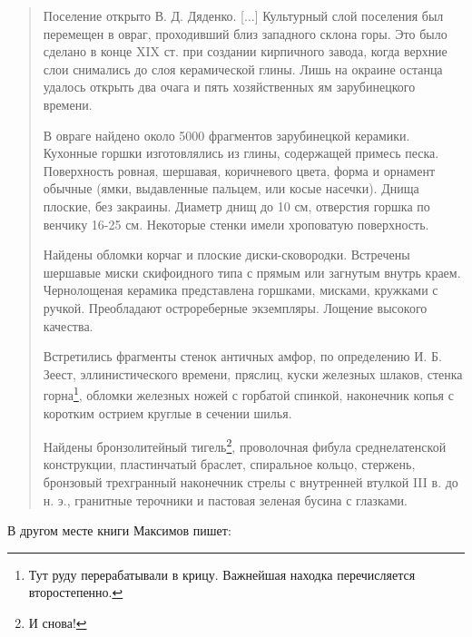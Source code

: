\begin{quotation}
Поселение открыто В. Д. Дяденко. [...] Культурный слой поселения был перемещен в овраг, проходивший близ западного склона горы. Это было сделано в конце XIX ст. при создании кирпичного завода, когда верхние слои снимались до слоя керамической глины. Лишь на окраине останца удалось открыть два очага и пять хозяйственных ям зарубинецкого времени. 

В овраге найдено около 5000 фрагментов зарубинецкой керамики. Кухонные горшки изготовлялись из глины, содержащей примесь песка. Поверхность ровная, шершавая, коричневого цвета, форма и орнамент обычные (ямки, выдавленные пальцем, или косые насечки). Днища плоские, без закраины. Диаметр днищ до 10 см, отверстия горшка по венчику 16-25 см. Некоторые стенки имели хроповатую поверхность. 

Найдены обломки корчаг и плоские диски-сковородки. Встречены шершавые миски скифоидного типа с прямым или загнутым внутрь краем. Чернолощеная керамика представлена горшками, мисками, кружками с ручкой. Преобладают острореберные экземпляры. Лощение высокого качества. 

Встретились фрагменты стенок античных амфор, по определению И. Б. Зеест, эллинистического времени, пряслиц, куски железных шлаков, стенка горна\footnote{Тут руду перерабатывали в крицу. Важнейшая находка перечисляется второстепенно.}, обломки железных ножей с горбатой спинкой, наконечник копья с коротким острием круглые в сечении шилья. 

Найдены бронзолитейный тигель\footnote{И снова!}, проволочная фибула среднелатенской конструкции, пластинчатый браслет, спиральное кольцо, стержень, бронзовый трехгранный наконечник стрелы с внутренней втулкой III в. до н. э., гранитные терочники и пастовая зеленая бусина с глазками.
\end{quotation}

В другом месте книги Максимов пишет:

